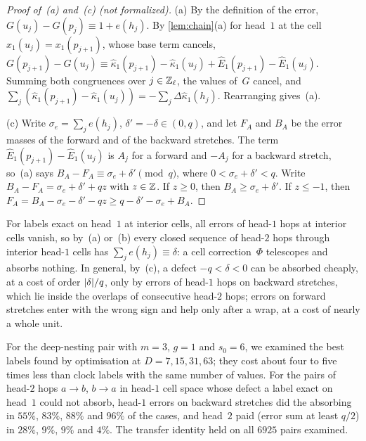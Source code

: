 \begin{proof}[Proof of~(a) and~(c) (not formalized)]
(a) By the definition of the error, $G(u_j)-G(p_j)\equiv1+e(h_j)$. By \cref{lem:chain}(a) for head~$1$ at the cell
$x_1(u_j)=x_1(p_{j+1})$, whose base term cancels,
$G(p_{j+1})-G(u_j)\equiv\hat\kappa_1(p_{j+1})-\hat\kappa_1(u_j)+\hat E_1(p_{j+1})-\hat E_1(u_j)$. Summing both
congruences over $j\in\mathbb{Z}_\ell$, the values of~$G$ cancel, and $\sum_j(\hat\kappa_1(p_{j+1})-\hat\kappa_1(u_j))
=-\sum_j\Delta\hat\kappa_1(h_j)$. Rearranging gives~(a).

(c) Write $\sigma_e=\sum_je(h_j)$, $\delta'=-\delta\in(0,q)$, and let $F_A$ and $B_A$ be the error masses of the forward
and of the backward stretches. The term $\hat E_1(p_{j+1})-\hat E_1(u_j)$ is $A_j$ for a forward and $-A_j$ for a
backward stretch, so~(a) says $B_A-F_A\equiv\sigma_e+\delta'\pmod q$, where $0<\sigma_e+\delta'<q$. Write
$B_A-F_A=\sigma_e+\delta'+qz$ with $z\in\mathbb{Z}$. If $z\ge0$, then $B_A\ge\sigma_e+\delta'$. If $z\le-1$, then
$F_A=B_A-\sigma_e-\delta'-qz\ge q-\delta'-\sigma_e+B_A$.
\end{proof}

For labels exact on head~$1$ at interior cells, all errors of head-$1$ hops at interior cells vanish, so by~(a) or~(b)
every closed sequence of head-$2$ hops through interior head-$1$ cells has $\sum_je(h_j)\equiv\delta$: a cell
correction~$\Phi$ telescopes and absorbs nothing. In general, by~(c), a defect $-q<\delta<0$ can be absorbed cheaply,
at a cost of order $\lvert \delta \rvert/q$, only by errors of head-$1$ hops on backward stretches, which lie inside the overlaps of
consecutive head-$2$ hops; errors on forward stretches enter with the wrong sign and help only after a wrap, at a cost of nearly a whole
unit.

\begin{remark}\label{rem:dep-absorb}
For the deep-nesting pair with $m=3$, $g=1$ and $s_0=6$, we examined the best labels found by optimisation at
$D=7,15,31,63$; they cost about four to five times less than clock labels with the same number of values. For the
pairs of head-$2$ hops $a\to b$, $b\to a$ in head-$1$ cell space whose defect a label exact on head~$1$ could not
absorb, head-$1$ errors on backward stretches did the absorbing in $55\%$, $83\%$, $88\%$ and $96\%$ of the cases,
and head~$2$ paid (error sum at least $q/2$) in $28\%$, $9\%$, $9\%$ and $4\%$. The transfer identity held on all
$6925$ pairs examined.
\end{remark}

